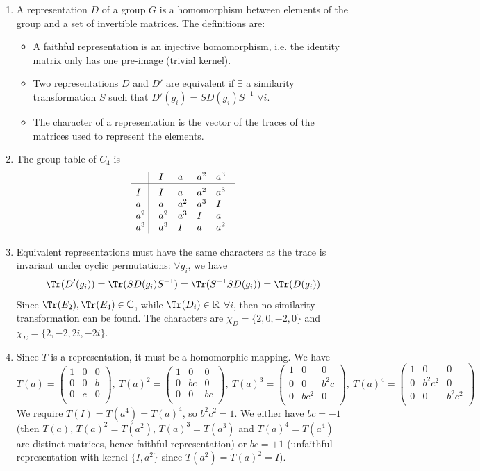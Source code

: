 \documentclass[a4paper]{article}
\begin{document}
\begin{ans}\leavevmode
\begin{enumerate}[label=(\roman*)]
\item A representation $D$ of a group $G$ is a homomorphism between elements of the group and a set of invertible matrices. The definitions are:
\begin{itemize}
\item A faithful representation is an injective homomorphism, i.e. the identity matrix only has one pre-image (trivial kernel). 
\item Two representations $D$ and $D'$ are equivalent if $\exists$ a similarity transformation $S$ such that $D'(g_i)=SD(g_i)S^{-1}$ $\forall i$.
\item The character of a representation is the vector of the traces of the matrices used to represent the elements.
\end{itemize}
\item The group table of $C_4$ is
$$\vbox{\tabskip0.5em\offinterlineskip
    \halign{\strut$#$\hfil\ \tabskip1em\vrule&&$#$\hfil\cr
       & I & a &a^2&a^3 \cr
    \noalign{\hrule}\vrule height 12pt width 0pt
    I & I & a &a^2&a^3 \cr
    a & a & a^2 & a^3 & I \cr
    a^2 & a^2 &a^3 & I &a \cr
    a^3 & a^3 & I & a& a^2\cr
}}$$
\item Equivalent representations must have the same characters as the trace is invariant under cyclic permutations: $\forall g_i$, we have
$$\Tr(D'(g_i))=\Tr(SD(g_i)S^{-1})=\Tr(S^{-1}SD(g_i))=\Tr(D(g_i))$$
Since $\Tr(E_2),\Tr(E_4)\in\mathbb{C}$, while $\Tr(D_i)\in\mathbb{R}$ $\forall i$, then no similarity transformation can be found. The characters are $\chi_D=\{2,0,-2,0\}$ and $\chi_E=\{2,-2,2i,-2i\}$.
\item Since $T$ is a representation, it must be a homomorphic mapping. We have
$$T(a)=\begin{pmatrix}1&0&0\\0&0&b\\0&c&0\\\end{pmatrix},~ T(a)^2=\begin{pmatrix}1&0&0\\0&bc&0\\0&0&bc\\\end{pmatrix},~ T(a)^3=\begin{pmatrix}1&0&0\\0&0&b^2c\\0&bc^2&0\\\end{pmatrix},~ T(a)^4=\begin{pmatrix}1&0&0\\0&b^2c^2&0\\0&0&b^2c^2\\\end{pmatrix}$$
We require $T(I)=T(a^4)=T(a)^4$, so $b^2c^2=1$. We either have $bc=-1$ (then $T(a)$, $T(a)^2=T(a^2)$, $T(a)^3=T(a^3)$ and $T(a)^4=T(a^4)$ are distinct matrices, hence faithful representation) or $bc=+1$ (unfaithful representation with kernel $\{I,a^2\}$ since $T(a^2)=T(a)^2=I$).
\end{enumerate}
\end{ans}
\newpage
\end{document}

